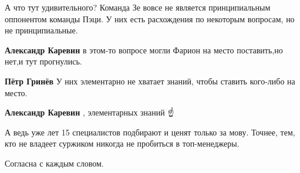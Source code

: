 \begin{itemize}
\begin{itemize}
А что тут удивительного? Команда Зе вовсе не является принципиальным оппонентом команды Пэци. У них есть расхождения по некоторым вопросам, но не принципиальные.

 
\textbf{Александр Каревин} в этом-то вопросе могли Фарион на место поставить,но нет,и тут прогнулись.

 
\textbf{Пётр Гринёв} У них элементарно не хватает знаний, чтобы ставить кого-либо на место.

 
\textbf{Александр Каревин} , элементарных знаний ☝️
\end{itemize}

 
А ведь уже лет 15 специалистов подбирают и ценят только за мову. Точнее, тем, кто не владеет суржиком никогда не пробиться в топ-менеджеры.

 

Согласна с каждым словом.

 

\end{itemize}
